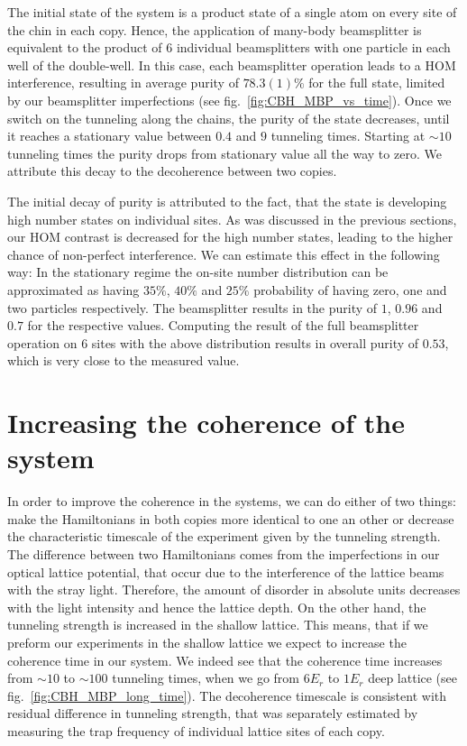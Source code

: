 The initial state of the system is a product state of a single atom on every site of the chin in each copy. Hence, the application of many-body beamsplitter is equivalent to the product of $6$ individual beamsplitters with one particle in each well of the double-well. In this case, each beamsplitter operation leads to a HOM interference, resulting in average purity of $78.3(1)\%$ for the full state, limited by our beamsplitter imperfections (see fig.~\ref{fig:CBH_MBP_vs_time}). Once we switch on the tunneling along the chains, the purity of the state decreases, until it reaches a stationary value between $0.4$ and $ 9$ tunneling times. Starting at $\sim 10$ tunneling times the purity drops from stationary value all the way to zero. We attribute this decay to the decoherence between two copies.

The initial decay of purity is attributed to the fact, that the state is developing high number states on individual sites. As was discussed in the previous sections, our HOM contrast is decreased for the high number states, leading to the higher chance of non-perfect interference. We can estimate this effect in the following way: In the stationary regime the on-site number distribution can be approximated as having $35\%$, $40\%$ and $25\%$ probability of having zero, one and two particles respectively. The beamsplitter results in the purity of $1$, $0.96$ and $0.7$ for the respective values. Computing the result of the full beamsplitter operation on $6$ sites with the above distribution results in overall purity of $0.53$, which is very close to the measured value.

\section{Increasing the coherence of the system}
In order to improve the coherence in the systems, we can do either of two things: make the Hamiltonians in both copies more identical to one an other or decrease the characteristic timescale of the experiment given by the tunneling strength. The difference between two Hamiltonians comes from the imperfections in our optical lattice potential, that occur due to the interference of the lattice beams with the stray light. Therefore, the amount of disorder in absolute units decreases with the light intensity and hence the lattice depth. On the other hand, the tunneling strength is increased in the shallow lattice. This means, that if we preform our experiments in the shallow lattice we expect to increase the coherence time in our system. We indeed see that the coherence time increases from $\sim 10$ to $\sim 100$ tunneling times, when we go from $6 E_r$ to $1 E_r$ deep lattice (see fig.~\ref{fig:CBH_MBP_long_time}). The decoherence timescale is consistent with residual difference in tunneling strength, that was separately estimated by measuring the trap frequency of individual lattice sites of each copy. 

